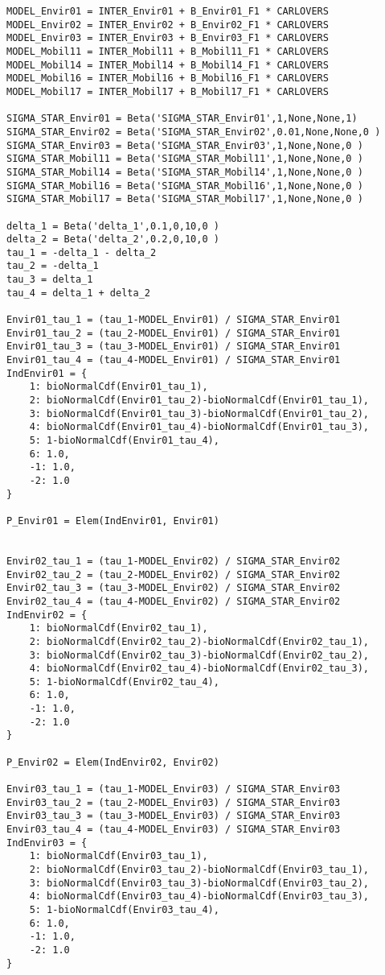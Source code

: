 \documentclass[12pt,a4paper]{article}
\begin{document}
\begin{lstlisting}[style=numbers]
MODEL_Envir01 = INTER_Envir01 + B_Envir01_F1 * CARLOVERS
MODEL_Envir02 = INTER_Envir02 + B_Envir02_F1 * CARLOVERS
MODEL_Envir03 = INTER_Envir03 + B_Envir03_F1 * CARLOVERS
MODEL_Mobil11 = INTER_Mobil11 + B_Mobil11_F1 * CARLOVERS
MODEL_Mobil14 = INTER_Mobil14 + B_Mobil14_F1 * CARLOVERS
MODEL_Mobil16 = INTER_Mobil16 + B_Mobil16_F1 * CARLOVERS
MODEL_Mobil17 = INTER_Mobil17 + B_Mobil17_F1 * CARLOVERS

SIGMA_STAR_Envir01 = Beta('SIGMA_STAR_Envir01',1,None,None,1)
SIGMA_STAR_Envir02 = Beta('SIGMA_STAR_Envir02',0.01,None,None,0 )
SIGMA_STAR_Envir03 = Beta('SIGMA_STAR_Envir03',1,None,None,0 )
SIGMA_STAR_Mobil11 = Beta('SIGMA_STAR_Mobil11',1,None,None,0 )
SIGMA_STAR_Mobil14 = Beta('SIGMA_STAR_Mobil14',1,None,None,0 )
SIGMA_STAR_Mobil16 = Beta('SIGMA_STAR_Mobil16',1,None,None,0 )
SIGMA_STAR_Mobil17 = Beta('SIGMA_STAR_Mobil17',1,None,None,0 )

delta_1 = Beta('delta_1',0.1,0,10,0 )
delta_2 = Beta('delta_2',0.2,0,10,0 )
tau_1 = -delta_1 - delta_2
tau_2 = -delta_1 
tau_3 = delta_1
tau_4 = delta_1 + delta_2

Envir01_tau_1 = (tau_1-MODEL_Envir01) / SIGMA_STAR_Envir01
Envir01_tau_2 = (tau_2-MODEL_Envir01) / SIGMA_STAR_Envir01
Envir01_tau_3 = (tau_3-MODEL_Envir01) / SIGMA_STAR_Envir01
Envir01_tau_4 = (tau_4-MODEL_Envir01) / SIGMA_STAR_Envir01
IndEnvir01 = {
    1: bioNormalCdf(Envir01_tau_1),
    2: bioNormalCdf(Envir01_tau_2)-bioNormalCdf(Envir01_tau_1),
    3: bioNormalCdf(Envir01_tau_3)-bioNormalCdf(Envir01_tau_2),
    4: bioNormalCdf(Envir01_tau_4)-bioNormalCdf(Envir01_tau_3),
    5: 1-bioNormalCdf(Envir01_tau_4),
    6: 1.0,
    -1: 1.0,
    -2: 1.0
}

P_Envir01 = Elem(IndEnvir01, Envir01)


Envir02_tau_1 = (tau_1-MODEL_Envir02) / SIGMA_STAR_Envir02
Envir02_tau_2 = (tau_2-MODEL_Envir02) / SIGMA_STAR_Envir02
Envir02_tau_3 = (tau_3-MODEL_Envir02) / SIGMA_STAR_Envir02
Envir02_tau_4 = (tau_4-MODEL_Envir02) / SIGMA_STAR_Envir02
IndEnvir02 = {
    1: bioNormalCdf(Envir02_tau_1),
    2: bioNormalCdf(Envir02_tau_2)-bioNormalCdf(Envir02_tau_1),
    3: bioNormalCdf(Envir02_tau_3)-bioNormalCdf(Envir02_tau_2),
    4: bioNormalCdf(Envir02_tau_4)-bioNormalCdf(Envir02_tau_3),
    5: 1-bioNormalCdf(Envir02_tau_4),
    6: 1.0,
    -1: 1.0,
    -2: 1.0
}

P_Envir02 = Elem(IndEnvir02, Envir02)

Envir03_tau_1 = (tau_1-MODEL_Envir03) / SIGMA_STAR_Envir03
Envir03_tau_2 = (tau_2-MODEL_Envir03) / SIGMA_STAR_Envir03
Envir03_tau_3 = (tau_3-MODEL_Envir03) / SIGMA_STAR_Envir03
Envir03_tau_4 = (tau_4-MODEL_Envir03) / SIGMA_STAR_Envir03
IndEnvir03 = {
    1: bioNormalCdf(Envir03_tau_1),
    2: bioNormalCdf(Envir03_tau_2)-bioNormalCdf(Envir03_tau_1),
    3: bioNormalCdf(Envir03_tau_3)-bioNormalCdf(Envir03_tau_2),
    4: bioNormalCdf(Envir03_tau_4)-bioNormalCdf(Envir03_tau_3),
    5: 1-bioNormalCdf(Envir03_tau_4),
    6: 1.0,
    -1: 1.0,
    -2: 1.0
}


\end{lstlisting}
\end{document}
